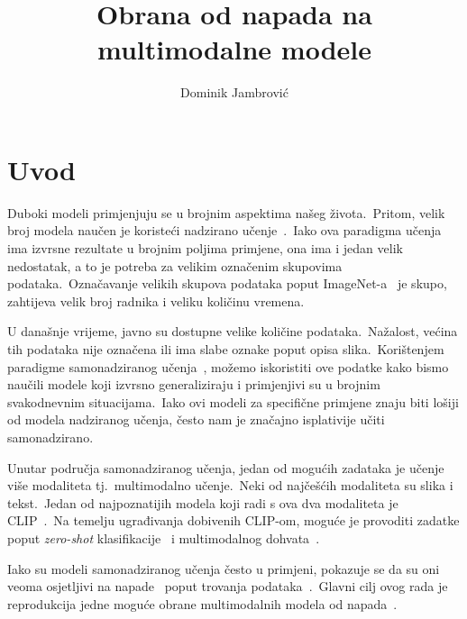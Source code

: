 \documentclass[times, utf8, seminar, numeric]{fer}
\begin{document}
\title{Obrana od napada na multimodalne modele}

\author{Dominik Jambrović}


\maketitle

\tableofcontents

\chapter{Uvod}

Duboki modeli primjenjuju se u brojnim aspektima našeg života.\ Pritom, velik broj modela naučen je koristeći nadzirano učenje~\cite{tian2022comprehensive}.\ 
Iako ova paradigma učenja ima izvrsne rezultate u brojnim poljima primjene, ona ima i jedan velik nedostatak, a to je potreba za velikim označenim skupovima podataka.\ 
Označavanje velikih skupova podataka poput ImageNet-a~\cite{deng2009imagenet} je skupo, zahtijeva velik broj radnika i veliku količinu vremena.\ 
  
U današnje vrijeme, javno su dostupne velike količine podataka.\ Nažalost, većina tih podataka nije označena ili ima slabe oznake poput opisa slika.\ 
Korištenjem paradigme samonadziranog učenja~\cite{liu2021self}, možemo iskoristiti ove podatke kako bismo naučili modele koji izvrsno generaliziraju i primjenjivi su u brojnim svakodnevnim situacijama.\ 
Iako ovi modeli za specifične primjene znaju biti lošiji od modela nadziranog učenja, često nam je značajno isplativije učiti samonadzirano.\ 

Unutar područja samonadziranog učenja, jedan od mogućih zadataka je učenje više modaliteta tj.\ multimodalno učenje.\ Neki od najčešćih modaliteta su slika i tekst.\ 
Jedan od najpoznatijih modela koji radi s ova dva modaliteta je CLIP~\cite{radford2021learning}.\ Na temelju ugrađivanja dobivenih CLIP-om, moguće je provoditi zadatke poput \textit{zero-shot} klasifikacije~\cite{xian2018zero} i multimodalnog dohvata~\cite{wang2016comprehensive}.\
  
Iako su modeli samonadziranog učenja često u primjeni, pokazuje se da su oni veoma osjetljivi na napade~\cite{carlini2024poisoning} poput trovanja podataka~\cite{chen2017targeted}.\ 
Glavni cilj ovog rada je reprodukcija jedne moguće obrane multimodalnih modela od napada~\cite{yang2023better}.\
\end{document}
